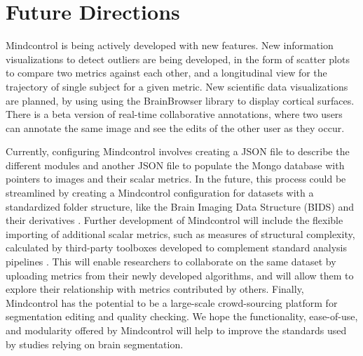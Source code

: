 \section{Future Directions}

Mindcontrol is being actively developed with new features. New information visualizations to detect outliers are being developed, in the form of scatter plots to compare two metrics against each other, and a longitudinal view for the trajectory of single subject for a given metric. New scientific data visualizations are planned, by using using the BrainBrowser library \cite{Sherif_2015} to display cortical surfaces. There is a beta version of real-time collaborative annotations, where two users can annotate the same image and see the edits of the other user as they occur. 

Currently, configuring Mindcontrol involves creating a JSON file to describe the different modules and another JSON file to populate the Mongo database with pointers to images and their scalar metrics. In the future, this process could be streamlined by creating a Mindcontrol configuration for datasets with a standardized folder structure, like the Brain Imaging Data Structure (BIDS) \cite{Gorgolewski_2016} and their derivatives \cite{gorgolewski2016bids}. Further development of Mindcontrol will include the flexible importing of additional scalar metrics, such as measures of structural complexity, calculated by third-party toolboxes developed to complement standard analysis pipelines \cite{madan2016,madan2017}. This will enable researchers to collaborate on the same dataset by uploading metrics from their newly developed algorithms, and will allow them to explore their relationship with metrics contributed by others. Finally, Mindcontrol has the potential to be a large-scale crowd-sourcing platform for segmentation editing and quality checking. We hope the functionality, ease-of-use, and modularity offered by Mindcontrol will help to improve the standards used by studies relying on brain segmentation.